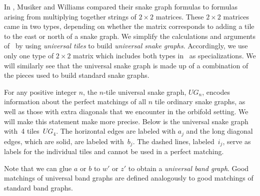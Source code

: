 \documentclass[11pt]{article}
\numberwithin{equation}{section}
\begin{document}
In \cite{MW}, Musiker and Williams compared their snake graph formulas to formulas arising from multiplying together strings of $2 \times 2$ matrices. These $2 \times 2$ matrices came in two types, depending on whether the matrix corresponds to adding a tile to the east or north of a snake graph. We simplify the calculations and arguments of~\cite{MW} by using \emph{universal tiles} to build \emph{universal snake graphs}. Accordingly, we use only one type of $2 \times 2$ matrix which includes both types in~\cite{MW} as specializations. We will similarly see that the universal snake graph is made up of a combination of the pieces used to build standard snake graphs.

For any positive integer $n$, the $n$-tile universal snake graph, $UG_n$, encodes information about the perfect matchings of all $n$ tile ordinary snake graphs, as well as those with extra diagonals that we encounter in the orbifold setting. We will make this statement make more precise. Below is the universal snake graph with~4 tiles~$UG_4$. The horizontal edges are labeled with $a_j$ and the long diagonal edges, which are solid, are labeled with~$b_j$. The dashed lines, labeled~$i_j$, serve as labels for the individual tiles and cannot be used in a perfect mat\-ching.

\begin{center}
\end{center}

Note that we can glue $a$ or $b$ to $w'$ or $z'$ to obtain a \emph{universal band graph}. Good matchings of universal band graphs are defined analogously to good matchings of standard band graphs.
\end{document}
